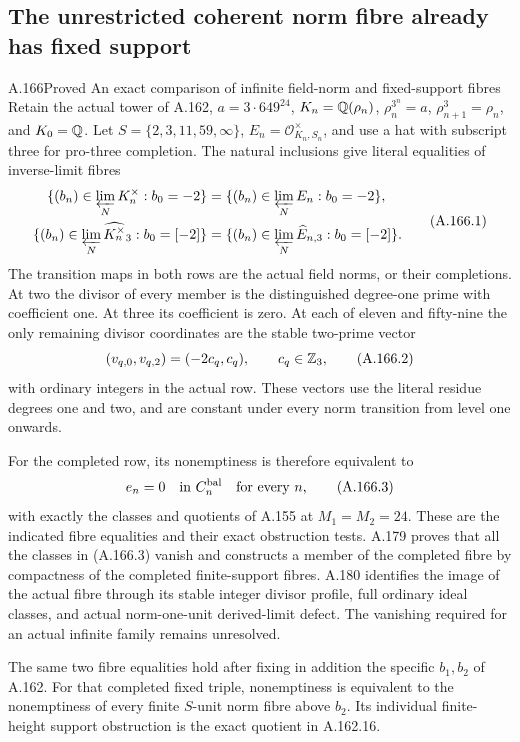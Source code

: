 \subsection{The unrestricted coherent norm fibre already has fixed support}

\begin{statement}{A.166}{Proved}
{An exact comparison of infinite field-norm and fixed-support fibres}
Retain the actual tower of A.162,
\(a=3\cdot649^{24}\), \(K_n=\mathbb Q(\rho_n)\),
\(\rho_n^{3^n}=a\), \(\rho_{n+1}^3=\rho_n\), and
\(K_0=\mathbb Q\).  Let \(S=\{2,3,11,59,\infty\}\),
\(E_n=\mathcal O_{K_n,S_n}^{\times}\), and use a hat with
subscript three for pro-three completion.  The natural inclusions give
literal equalities of inverse-limit fibres
\[
\begin{aligned}
 \{(b_n)\in\varprojlim_N K_n^\times:b_0=-2\}
   &=\{(b_n)\in\varprojlim_N E_n:b_0=-2\},\\
 \{(b_n)\in\varprojlim_N\widehat{K_n^\times}_3:b_0=[-2]\}
   &=\{(b_n)\in\varprojlim_N\widehat E_{n,3}:b_0=[-2]\}.
\end{aligned}
\tag{A.166.1}
\]
The transition maps in both rows are the actual field norms, or their
completions.  At two the divisor of every member is the distinguished
degree-one prime with coefficient one.  At three its coefficient is
zero.  At each of eleven and fifty-nine the only remaining divisor
coordinates are the stable two-prime vector
\[
                   (v_{q,0},v_{q,2})=(-2c_q,c_q),
                   \qquad c_q\in\mathbb Z_3,
\tag{A.166.2}
\]
with ordinary integers in the actual row.  These vectors use the
literal residue degrees one and two, and are constant under every
norm transition from level one onwards.

For the completed row, its nonemptiness is therefore equivalent to
\[
                        e_n=0\quad\hbox{in }C_n^{\rm bal}
                                   \quad\hbox{for every }n,
\tag{A.166.3}
\]
with exactly the classes and quotients of A.155 at \(M_1=M_2=24\).
These are the indicated fibre equalities and their exact obstruction
tests.  A.179 proves that all the classes in (A.166.3) vanish and
constructs a member of the completed fibre by compactness of the
completed finite-support fibres.  A.180 identifies the image of the
actual fibre through its stable integer divisor profile, full ordinary
ideal classes, and actual norm-one-unit derived-limit defect.  The
vanishing required for an actual infinite family remains unresolved.

The same two fibre equalities hold after fixing in addition the
specific \(b_1,b_2\) of A.162.  For that completed fixed triple,
nonemptiness is equivalent to the nonemptiness of every finite
\(S\)-unit norm fibre above \(b_2\).  Its individual finite-height
support obstruction is the exact quotient in A.162.16.
\end{statement}

